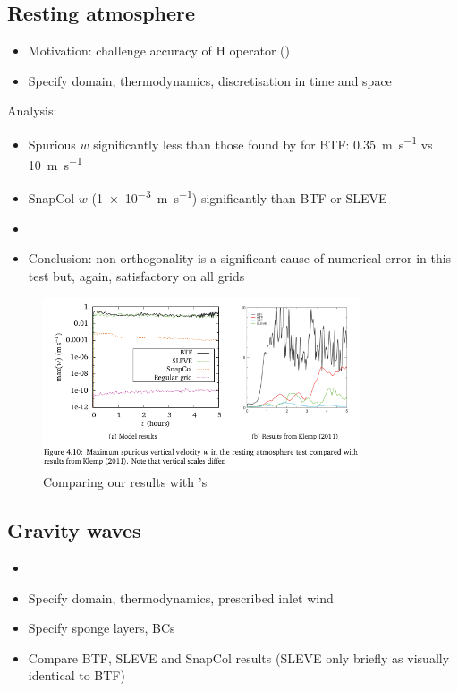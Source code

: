 \documentclass[twocol]{ametsoc}
\begin{document}
\subsection{Resting atmosphere}

\begin{itemize}
	\item Motivation: challenge accuracy of H operator ()
	\item Specify domain, thermodynamics, discretisation in time and space
\end{itemize}

Analysis:
\begin{itemize}
	\item Spurious $w$ significantly less than those found by \citet{klemp2011} for BTF: \SI{0.35}{\meter\per\second} vs \SI{10}{\meter\per\second}
	\item SnapCol $w$ (\SI{1e-3}{\meter\per\second}) significantly than BTF or SLEVE
	\item {}
	\item Conclusion: non-orthogonality is a significant cause of numerical error in this test but, again, satisfactory on all grids
\end{itemize}

\begin{figure}
	\includegraphics[height=2in]{resting-atmosphere-w.png}
%
	\caption{Comparing our results with \citet{klemp2011}'s}
	\label{fig:resting}
\end{figure}

\subsection{Gravity waves}
\begin{itemize}
	\item {}
	\item Specify domain, thermodynamics, prescribed inlet wind
	\item Specify sponge layers, BCs
	\item Compare BTF, SLEVE and SnapCol results (SLEVE only briefly as visually identical to BTF)
\end{itemize}
\end{document}
